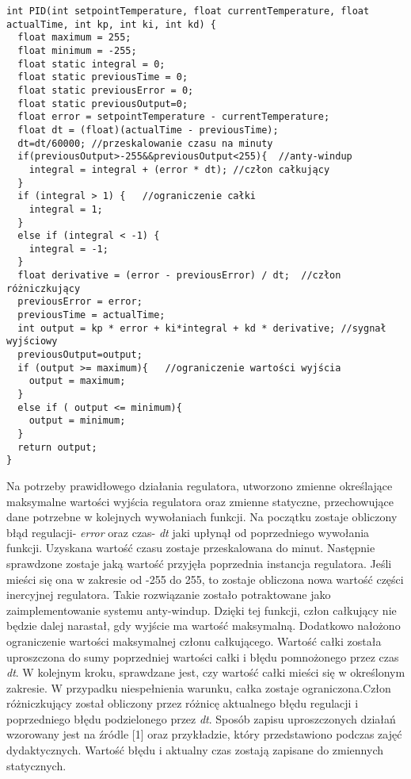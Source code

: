 \begin{lstlisting} 
int PID(int setpointTemperature, float currentTemperature, float actualTime, int kp, int ki, int kd) {
  float maximum = 255;
  float minimum = -255;
  float static integral = 0;
  float static previousTime = 0;
  float static previousError = 0;
  float static previousOutput=0;
  float error = setpointTemperature - currentTemperature;
  float dt = (float)(actualTime - previousTime);
  dt=dt/60000; //przeskalowanie czasu na minuty
  if(previousOutput>-255&&previousOutput<255){	//anty-windup
    integral = integral + (error * dt);	//człon całkujący
  }
  if (integral > 1) {	//ograniczenie całki
    integral = 1;
  }
  else if (integral < -1) {
    integral = -1;
  }
  float derivative = (error - previousError) / dt;	//człon różniczkujący
  previousError = error;
  previousTime = actualTime;
  int output = kp * error + ki*integral + kd * derivative; //sygnał wyjściowy
  previousOutput=output;
  if (output >= maximum){	//ograniczenie wartości wyjścia
    output = maximum;
  }
  else if ( output <= minimum){
    output = minimum;
  }
  return output;
}
\end{lstlisting}
Na potrzeby prawidłowego działania regulatora, utworzono zmienne określające maksymalne wartości wyjścia regulatora oraz zmienne statyczne, przechowujące dane potrzebne w kolejnych wywołaniach funkcji. Na początku zostaje obliczony błąd regulacji- \textit{error} oraz czas- \textit{dt} jaki upłynął od poprzedniego wywołania funkcji. Uzyskana wartość czasu zostaje przeskalowana do minut. Następnie sprawdzone zostaje jaką wartość przyjęła poprzednia instancja regulatora. Jeśli mieści się ona w zakresie od -255 do 255, to zostaje obliczona nowa wartość części inercyjnej regulatora. Takie rozwiązanie zostało potraktowane jako zaimplementowanie systemu anty-windup. Dzięki tej funkcji, człon całkujący nie będzie dalej narastał, gdy wyjście ma wartość maksymalną. Dodatkowo nałożono ograniczenie wartości maksymalnej członu całkującego. Wartość całki została uproszczona do sumy poprzedniej wartości całki i błędu pomnożonego przez czas \textit{dt}. W kolejnym kroku, sprawdzane jest, czy wartość całki mieści się w określonym zakresie. W przypadku niespełnienia warunku, całka zostaje ograniczona.Człon różniczkujący został obliczony przez różnicę aktualnego błędu regulacji i poprzedniego błędu podzielonego przez \textit{dt}. Sposób zapisu uproszczonych działań wzorowany jest na źródle [1] oraz przykładzie, który przedstawiono podczas zajęć dydaktycznych. Wartość błędu i aktualny czas zostają zapisane do zmiennych statycznych.

